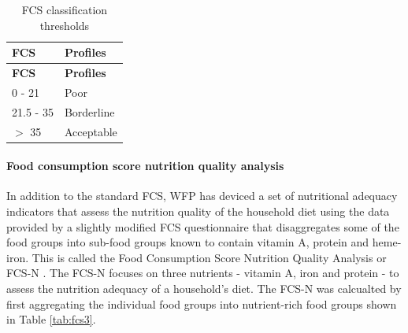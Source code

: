 \documentclass[12pt,a4paper]{article}
\let\oldparagraph\paragraph
\renewcommand{\paragraph}[1]{\oldparagraph{#1}\mbox{}}
\begin{document}
\begin{longtable}[]{@{}ll@{}}
\caption{\label{tab:fcsThresholds} FCS classification thresholds}\tabularnewline
\toprule
\begin{minipage}[b]{0.16\columnwidth}\raggedright
\textbf{FCS}\strut
\end{minipage} & \begin{minipage}[b]{0.20\columnwidth}\raggedright
\textbf{Profiles}\strut
\end{minipage}\tabularnewline
\midrule
\endfirsthead
\toprule
\begin{minipage}[b]{0.16\columnwidth}\raggedright
\textbf{FCS}\strut
\end{minipage} & \begin{minipage}[b]{0.20\columnwidth}\raggedright
\textbf{Profiles}\strut
\end{minipage}\tabularnewline
\midrule
\endhead
\begin{minipage}[t]{0.16\columnwidth}\raggedright
0 - 21\strut
\end{minipage} & \begin{minipage}[t]{0.20\columnwidth}\raggedright
Poor\strut
\end{minipage}\tabularnewline
\begin{minipage}[t]{0.16\columnwidth}\raggedright
21.5 - 35\strut
\end{minipage} & \begin{minipage}[t]{0.20\columnwidth}\raggedright
Borderline\strut
\end{minipage}\tabularnewline
\begin{minipage}[t]{0.16\columnwidth}\raggedright
\(>\) 35\strut
\end{minipage} & \begin{minipage}[t]{0.20\columnwidth}\raggedright
Acceptable\strut
\end{minipage}\tabularnewline
\bottomrule
\end{longtable}

\hypertarget{fcsn}{%
\paragraph{Food consumption score nutrition quality analysis}\label{fcsn}}

In addition to the standard FCS, WFP has deviced a set of nutritional adequacy indicators that assess the nutrition quality of the household diet using the data provided by a slightly modified FCS questionnaire that disaggregates some of the food groups into sub-food groups known to contain vitamin A, protein and heme-iron. This is called the Food Consumption Score Nutrition Quality Analysis or FCS-N \citep{WorldFoodProgramme:2015tn}. The FCS-N focuses on three nutrients - vitamin A, iron and protein - to assess the nutrition adequacy of a household's diet. The FCS-N was calcualted by first aggregating the individual food groups into nutrient-rich food groups shown in Table \ref{tab:fcs3}.
\end{document}

